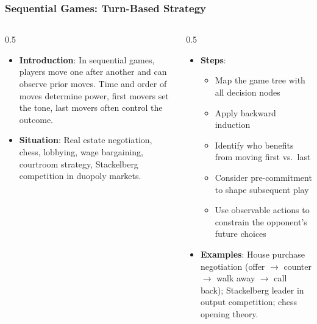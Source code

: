 \begin{frame}[fragile]\frametitle{Sequential Games: Turn-Based Strategy}
\begin{columns}
    \begin{column}[T]{0.5\linewidth}
      \begin{itemize}
        \item \textbf{Introduction}: In sequential games, players move one after another and can observe prior moves. Time and order of moves determine power, first movers set the tone, last movers often control the outcome.
        \item \textbf{Situation}: Real estate negotiation, chess, lobbying, wage bargaining, courtroom strategy, Stackelberg competition in duopoly markets.
      \end{itemize}
    \end{column}
    \begin{column}[T]{0.5\linewidth}
      \begin{itemize}
        \item \textbf{Steps}:
        \begin{itemize}
          \item Map the game tree with all decision nodes
          \item Apply backward induction
          \item Identify who benefits from moving first vs.\ last
          \item Consider pre-commitment to shape subsequent play
          \item Use observable actions to constrain the opponent's future choices
        \end{itemize}\item \textbf{Examples}: House purchase negotiation (offer $\rightarrow$ counter $\rightarrow$ walk away $\rightarrow$ call back); Stackelberg leader in output competition; chess opening theory.
      \end{itemize}
    \end{column}
  \end{columns}
\end{frame}


